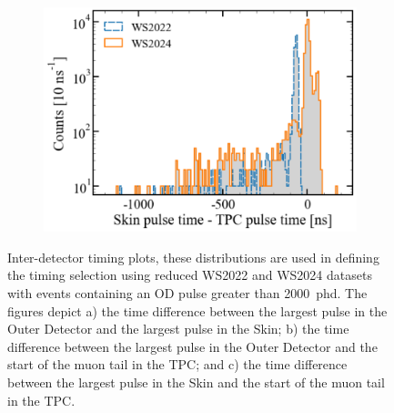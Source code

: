 \begin{figure}[h!]
\begin{subfigure}{0.5\textwidth}
    \includegraphics[width=\textwidth]{figures/Muons/Skin-TPC_timing.pdf}
    \caption{}
    \label{fig:Muons/Skin-TPC}
\end{subfigure}
\caption[Inter-detector timing plots used to define the muon flux timing selection.]{Inter-detector timing plots, these distributions are used in defining the timing selection using reduced WS2022 and WS2024 datasets with events containing an OD pulse greater than 2000~phd. The figures depict a) the time difference between the largest pulse in the Outer Detector and the largest pulse in the Skin; b) the time difference between the largest pulse in the Outer Detector and the start of the muon tail in the TPC; and c) the time difference between the largest pulse in the Skin and the start of the muon tail in the TPC.}
\label{fig:Muons/timing_plots}
\end{figure}

